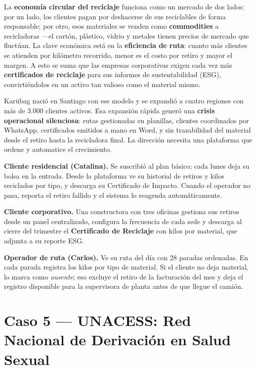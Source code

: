 \documentclass[12pt]{article}
\begin{document}
La \textbf{economía circular del reciclaje} funciona como un mercado de dos
lados: por un lado, los clientes pagan por deshacerse de sus reciclables de
forma responsable; por otro, esos materiales se venden como
\textbf{commodities} a recicladoras ---el cartón, plástico, vidrio y metales
tienen precios de mercado que fluctúan. La clave económica está en la
\textbf{eficiencia de ruta}: cuanto más clientes se atienden por kilómetro
recorrido, menor es el costo por retiro y mayor el margen. A esto se suma
que las empresas corporativas exigen cada vez más \textbf{certificados de
reciclaje} para sus informes de sustentabilidad (ESG), convirtiéndolos en
un activo tan valioso como el material mismo.

Karübag nació en Santiago con ese modelo y se expandió a cuatro regiones
con más de 3.000 clientes activos. Esa expansión rápida generó una
\textbf{crisis operacional silenciosa}: rutas gestionadas en planillas,
clientes coordinados por WhatsApp, certificados emitidos a mano en Word,
y sin trazabilidad del material desde el retiro hasta la recicladora final.
La dirección necesita una plataforma que ordene y automatice el crecimiento.

\noindent\textbf{Cliente residencial (Catalina).}
Se suscribió al plan básico; cada lunes deja su bolsa en la entrada.
Desde la plataforma ve su historial de retiros y kilos reciclados por
tipo, y descarga su Certificado de Impacto. Cuando el operador no pasa,
reporta el retiro fallido y el sistema lo reagenda automáticamente.

\noindent\textbf{Cliente corporativo.}
Una constructora con tres oficinas gestiona sus retiros desde un panel
centralizado, configura la frecuencia de cada sede y descarga al cierre
del trimestre el \textbf{Certificado de Reciclaje} con kilos por material,
que adjunta a su reporte ESG.

\noindent\textbf{Operador de ruta (Carlos).}
Ve su ruta del día con 28 paradas ordenadas. En cada parada registra los
kilos por tipo de material. Si el cliente no deja material, lo marca como
\textit{ausente}; eso excluye el retiro de la facturación del mes y deja
el registro disponible para la supervisora de planta antes de que llegue
el camión.

\newpage
\section{Caso 5 --- UNACESS: Red Nacional de Derivación en Salud Sexual}
\label{caso:5}
\end{document}
